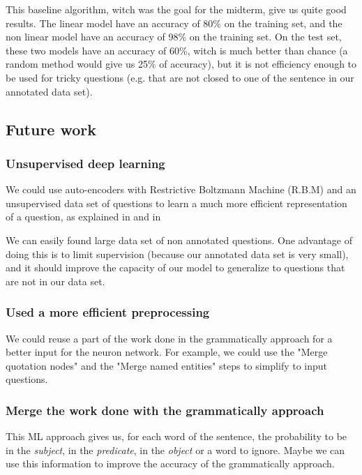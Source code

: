 This baseline algorithm, witch was the goal for the midterm, give us quite good results.
The linear model have an accuracy of 80\% on the training set, and the non linear model have an accuracy of 98\% on the training set.
On the test set, these two models have an accuracy of 60\%, witch is much better than chance (a random method would give us 25\% of accuracy), but it is not efficiency enough to be used for tricky questions (e.g. that are not closed to one of the sentence in our annotated data set).

\subsection{Future work}

\subsubsection{Unsupervised deep learning}

We could use auto-encoders  with Restrictive Boltzmann Machine (R.B.M) and an unsupervised data set of questions to learn a much more efficient representation of a question, as explained in \cite{fischer2012introduction} and in \cite{hinton2006reducing}

We can easily found large data set of non annotated questions.
One advantage of doing this is to limit supervision (because our annotated data set is very small), and it should improve the capacity of our model to generalize to questions that are not in our data set.

\subsubsection{Used a more efficient preprocessing}

We could reuse a part of the work done in the grammatically approach for a better input for the neuron network. For example, we could use the "Merge quotation nodes" and the "Merge named entities" steps to simplify to input questions.

\subsubsection{Merge the work done with the grammatically approach}

This ML approach gives us, for each word of the sentence, the probability to be in the \textit{subject}, in the \textit{predicate}, in the \textit{object} or a word to ignore.
Maybe we can use this information to improve the accuracy of the grammatically approach.


